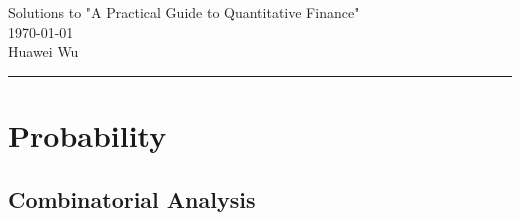 \documentclass[12pt,letterpaper, onecolumn]{exam}
\begin{document}
\begingroup  
    \centering
    \LARGE Solutions to "A Practical Guide to Quantitative Finance"\\[0.5em]
    \large \today\\[0.5em]
    \large Huawei Wu\par
\endgroup
\rule{\textwidth}{0.4pt}
\pointsdroppedatright   %
\printanswers
\renewcommand{\solutiontitle}{\noindent\textbf{Ans:}\enspace}   %



\section{Probability}

\subsection{Combinatorial Analysis}
\end{document}
